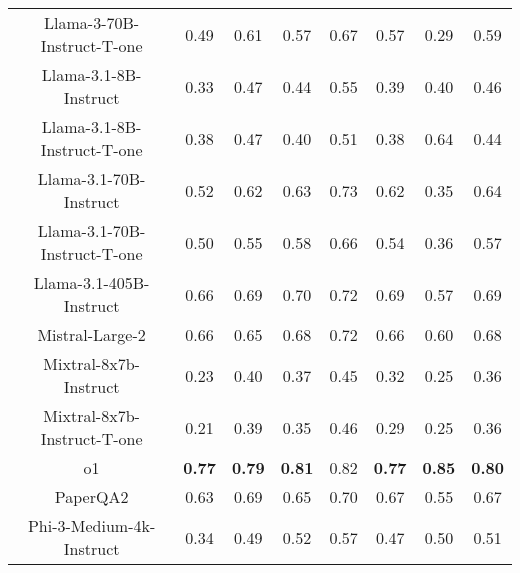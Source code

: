 \begin{tabular}{cccccccc}
Llama-3-70B-Instruct-T-one & 0.49 & 0.61 & 0.57 & 0.67 & 0.57 & 0.29 & 0.59 \\
Llama-3.1-8B-Instruct & 0.33 & 0.47 & 0.44 & 0.55 & 0.39 & 0.40 & 0.46 \\
Llama-3.1-8B-Instruct-T-one & 0.38 & 0.47 & 0.40 & 0.51 & 0.38 & 0.64 & 0.44 \\
Llama-3.1-70B-Instruct & 0.52 & 0.62 & 0.63 & 0.73 & 0.62 & 0.35 & 0.64 \\
Llama-3.1-70B-Instruct-T-one & 0.50 & 0.55 & 0.58 & 0.66 & 0.54 & 0.36 & 0.57 \\
Llama-3.1-405B-Instruct & 0.66 & 0.69 & 0.70 & 0.72 & 0.69 & 0.57 & 0.69 \\
Mistral-Large-2 & 0.66 & 0.65 & 0.68 & 0.72 & 0.66 & 0.60 & 0.68 \\
Mixtral-8x7b-Instruct & 0.23 & 0.40 & 0.37 & 0.45 & 0.32 & 0.25 & 0.36 \\
Mixtral-8x7b-Instruct-T-one & 0.21 & 0.39 & 0.35 & 0.46 & 0.29 & 0.25 & 0.36 \\
o1 & \textbf{0.77} & \textbf{0.79} & \textbf{0.81} & 0.82 & \textbf{0.77} & \textbf{0.85} & \textbf{0.80} \\
PaperQA2 & 0.63 & 0.69 & 0.65 & 0.70 & 0.67 & 0.55 & 0.67 \\
Phi-3-Medium-4k-Instruct & 0.34 & 0.49 & 0.52 & 0.57 & 0.47 & 0.50 & 0.51 \\
\bottomrule
\end{tabular}
